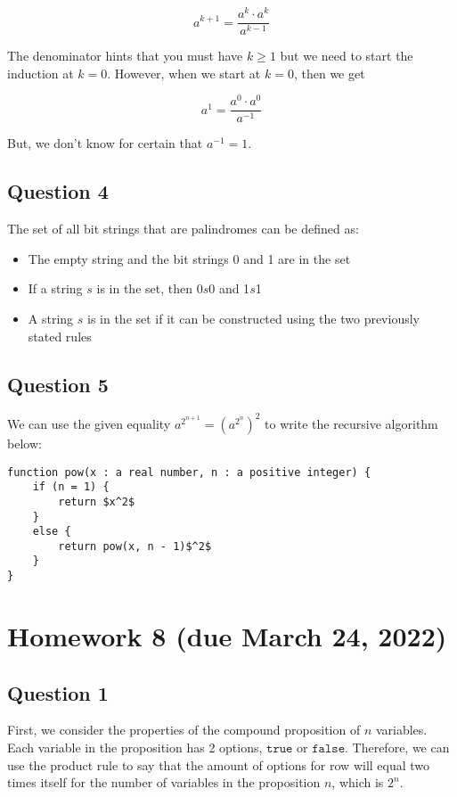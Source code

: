 \documentclass[letterpaper, 12pt]{article}
\begin{document}
\[a^{k + 1} = \frac{a^k \cdot a^k}{a^{k - 1}}\]

The denominator hints that you must have $k \geq 1$ but we need to start the induction at $k = 0$. However, when we start at $k = 0$, then we get

\[a^1 = \frac{a^0 \cdot a^0}{a^{-1}}\]

But, we don't know for certain that $a^{-1} = 1$.

\subsection*{Question 4}
The set of all bit strings that are palindromes can be defined as:

\begin{itemize}
    \item The empty string and the bit strings 0 and 1 are in the set
    \item If a string $s$ is in the set, then 0$s$0 and 1$s$1
    \item A string $s$ is in the set if it can be constructed using the two previously stated rules
\end{itemize}

\subsection*{Question 5}
We can use the given equality $a^{2^{n+1}} = (a^{2^{n}})^2$ to write the recursive algorithm below:

\begin{lstlisting}[mathescape=true]
function pow(x : a real number, n : a positive integer) {
    if (n = 1) {
        return $x^2$
    }
    else {
        return pow(x, n - 1)$^2$
    }
}
\end{lstlisting}

\section*{Homework 8 (due March 24, 2022)}

\subsection*{Question 1}
First, we consider the properties of the compound proposition of $n$ variables. Each variable in the proposition has 2 options, $\texttt{true}$ or $\texttt{false}$. Therefore, we can use the product rule to say that the amount of options for row will equal two times itself for the number of variables in the proposition $n$, which is $2^n$.
\end{document}
